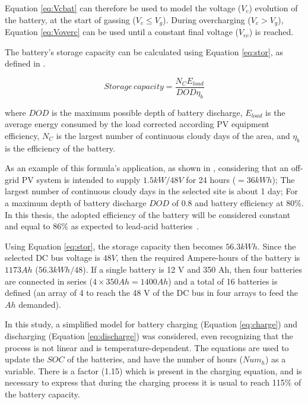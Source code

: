 Equation \ref{eq:Vcbat} can therefore be used to model the voltage ($ V_{c} $) evolution of the battery, at the start of gassing ($ V_{c} \leq V_{g} $). During overcharging ($ V_{c} > V_{g} $), Equation \ref{eq:Voverc} can be used until a constant final voltage ($ V_{ec} $) is reached.

The battery's storage capacity can be calculated using Equation \ref{eq:stor}, as defined in \cite{Wenham}.

\begin{equation}
\label{eq:stor}
Storage \, capacity = \dfrac{N_{C}E_{load}}{DOD \eta _{b}}
\end{equation}

\noindent where $ DOD $ is the maximum possible depth of battery discharge, $ E_{load} $ is the average energy consumed by the load corrected according PV equipment efficiency, $ N_{C} $ is the largest number of continuous cloudy days of the area, and $ \eta_{b} $ is the efficiency of the battery.

As an example of this formula's application, as shown in \cite{Abdulateef}, considering that an off-grid PV system is intended to supply $1.5 kW/48 V$ for 24 hours ($=36 kWh$); The largest number of continuous cloudy days in the selected site is about 1 day; For a maximum depth of battery discharge $DOD$ of $0.8$ and battery efficiency at $80\%$. In this thesis, the adopted efficiency of the battery will be considered constant and equal to $86\%$ as expected to lead-acid batteries~\cite{Pinho}.

Using Equation \ref{eq:stor}, the storage capacity then becomes $56.3 kWh$. Since the selected DC bus voltage is $48 V$, then the required Ampere-hours of the battery is $1173 Ah$ ($56.3 kWh/48$). If a single battery is 12 V and 350 Ah, then four batteries are connected in series ($4 \times 350 Ah = 1400 Ah$) and a total of 16 batteries is defined (an array of 4 to reach the 48 V of the DC bus in four arrays to feed the $Ah$ demanded).

In this study, a simplified model for battery charging (Equation \ref{eq:charge}) and discharging (Equation \ref{eq:discharge}) was considered, even recognizing that the process is not linear and is temperature-dependent. The equations are used to update the $SOC$ of the batteries, and have the number of hours ($ Num_{h} $) as a variable. There is a factor (1.15) which is present in the charging equation, and is necessary to express that during the charging process it is usual to reach 115\% of the battery capacity.

